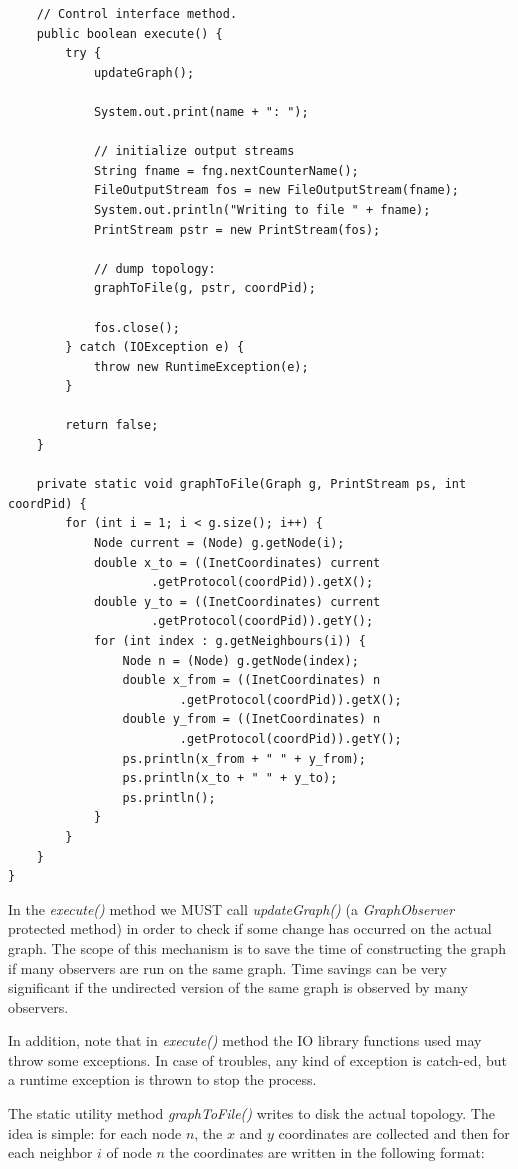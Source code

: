 \documentclass[a4paper,12pt]{article}
\begin{document}
\begin{verbatim}
    // Control interface method.
    public boolean execute() {
        try {
            updateGraph();

            System.out.print(name + ": ");

            // initialize output streams
            String fname = fng.nextCounterName();
            FileOutputStream fos = new FileOutputStream(fname);
            System.out.println("Writing to file " + fname);
            PrintStream pstr = new PrintStream(fos);

            // dump topology:
            graphToFile(g, pstr, coordPid);

            fos.close();
        } catch (IOException e) {
            throw new RuntimeException(e);
        }

        return false;
    }

    private static void graphToFile(Graph g, PrintStream ps, int coordPid) {
        for (int i = 1; i < g.size(); i++) {
            Node current = (Node) g.getNode(i);
            double x_to = ((InetCoordinates) current
                    .getProtocol(coordPid)).getX();
            double y_to = ((InetCoordinates) current
                    .getProtocol(coordPid)).getY();
            for (int index : g.getNeighbours(i)) {
                Node n = (Node) g.getNode(index);
                double x_from = ((InetCoordinates) n
                        .getProtocol(coordPid)).getX();
                double y_from = ((InetCoordinates) n
                        .getProtocol(coordPid)).getY();
                ps.println(x_from + " " + y_from);
                ps.println(x_to + " " + y_to);
                ps.println();
            }
        }
    }
}
\end{verbatim}
\normalsize

In the \emph{execute()} method we MUST call \emph{updateGraph()} (a
\emph{GraphObserver} protected method) in order to check if some
change has occurred on the actual graph. 
The scope of this mechanism is to save the time of constructing the
graph if many observers are run on the same graph. Time savings can be very
significant if the undirected version of the same graph is observed by
many observers.

In addition, note that in \emph{execute()} method the IO library functions
used may throw some exceptions. In case of troubles, any kind of
exception is catch-ed, but a runtime exception is thrown to stop the
process. 

The static utility method \emph{graphToFile()} writes to disk the
actual topology. The idea is simple: for each node
$n$, the $x$ and $y$ coordinates are collected and then for each
neighbor $i$ of node $n$ the coordinates are written in the following
format: 
\end{document}
